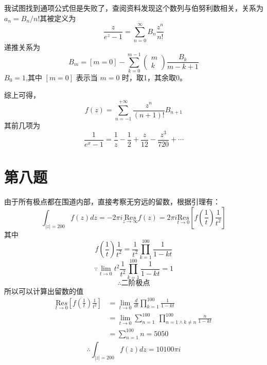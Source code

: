 \documentclass[a4paper]{ctexart}
\begin{document}
我试图找到通项公式但是失败了，查阅资料发现这个数列与伯努利数相关，关系为$a_n=B_n/n!$其被定义为
$$\frac{z}{e^{z}-1}=\sum_{n=0}^{\infty} B_{n} \frac{z^{n}}{n !}$$
递推关系为
$$B_{m}=[m=0]-\sum_{k=0}^{m-1}\left(\begin{array}{c}
            m \\
            k
        \end{array}\right) \frac{B_{k}}{m-k+1}$$
$B_0=1$,其中 $[m=0]$ 表示当 $m=0$ 时，取1，其余取0。

综上可得，
$$
    f\left( z \right) =\sum_{n=-1}^{+\infty}{\frac{z^n}{\left( n+1 \right) !}B_{n+1}}
$$
其前几项为
$$
    \frac{1}{e^x-1}=\frac{1}{z}-\frac{1}{2}+\frac{z}{12}-\frac{z^3}{720}+\cdots
$$

\section{第八题}
由于所有极点都在围道内部，直接考察无穷远的留数，根据引理有：
$$
    \int_{|z|=200}{f\left( z \right) dz}=-2\pi i\underset{z\rightarrow \infty}{\text{Re}s}f\left( z \right) =2\pi i\underset{t\rightarrow 0}{\text{Re}s}\left[ f\left( \frac{1}{t} \right) \frac{1}{t^2} \right]
$$
其中
$$
    f\left( \frac{1}{t} \right) \frac{1}{t^2}=\frac{1}{t^2}\prod_{k=1}^{100}{\frac{1}{1-kt}}
$$
$$
    \because \underset{t\rightarrow 0}{\lim}t^2\frac{1}{t^2}\prod_{k=1}^{100}{\frac{1}{1-kt}}=1
$$
$$
    \therefore \text{二阶极点}
$$
所以可以计算出留数的值
$$
    \begin{aligned}
        \underset{t\rightarrow 0}{\text{Re}s}\left[ f\left( \frac{1}{t} \right) \frac{1}{t^2} \right]
         & =\underset{t\rightarrow 0}{\lim}\frac{d}{dt}\prod_{k=1}^{100}{\frac{1}{1-kt}}                      \\
         & =\underset{t\rightarrow 0}{\lim}\sum_{n=1}^{100}{\ \prod_{n=1 \land k\ne n}^{100}{\frac{n}{1-kt}}} \\
         & =\sum_{n=1}^{100}{n}=5050
    \end{aligned}
$$
$$
    \therefore \int_{|z|=200}{f\left( z \right) dz}=10100\pi i
$$
\end{document}
